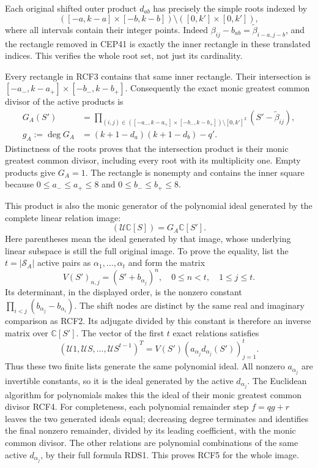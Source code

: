 \documentclass[11pt,a4paper]{article}
\begin{document}
Each original shifted outer product $d_{ab}$ has precisely the
simple roots indexed by
\[
 ([-a,k-a]\times[-b,k-b])\setminus([0,k']\times[0,k']),
 \tag{RCF3}
\]
where all intervals contain their integer points. Indeed
$\beta_{ij}-b_{ab}=\widetilde\beta_{i-a,j-b}$, and the
rectangle removed in CEP41 is exactly the inner rectangle in
these translated indices. This verifies the whole root set,
not just its cardinality.

Every rectangle in RCF3 contains that same inner rectangle.
Their intersection is
$[-a_-,k-a_+]\times[-b_-,k-b_+]$. Consequently the exact
monic greatest common divisor of the active products is
\[
 \begin{split}
 G_A(S')&=
 \prod_{(i,j)\in
   ([-a_-,k-a_+]\times[-b_-,k-b_+])\setminus[0,k']^2}
          (S'-\widetilde\beta_{ij}),\\
 g_A:=\deg G_A&=(k+1-d_a)(k+1-d_b)-q'.
 \end{split}\tag{RCF4}
\]
Distinctness of the roots proves that the intersection product
is their monic greatest common divisor, including every root
with its multiplicity one. Empty products give $G_A=1$.
The rectangle is nonempty and contains the inner square because
$0\le a_-\le a_+\le8$ and $0\le b_-\le b_+\le8$.

This product is also the monic generator of the polynomial
ideal generated by the complete linear relation image:
\[
 (\mathcal U\mathbb C[S])=G_A\mathbb C[S'].
 \tag{RCF5}
\]
Here parentheses mean the ideal generated by that image, whose
underlying linear subspace is still the full original image.
To prove the equality, list the $t=|\mathcal S_A|$ active pairs
as $\alpha_1,\ldots,\alpha_t$ and form the matrix
\[
 V(S')_{n,j}=(S'+b_{\alpha_j})^n,
       \quad 0\le n<t,\quad 1\le j\le t.
 \tag{RCF6}
\]
Its determinant, in the displayed order, is the nonzero
constant $\prod_{i<j}(b_{\alpha_j}-b_{\alpha_i})$.
The shift nodes are distinct by the same real and imaginary
comparison as RCF2. Its adjugate divided by this constant is
therefore an inverse matrix over $\mathbb C[S']$.
The vector of the first $t$ exact relations satisfies
\[
 (\mathcal U1,\mathcal US,\ldots,\mathcal US^{t-1})^T
       =V(S')(a_{\alpha_j}d_{\alpha_j}(S'))_{j=1}^t.
 \tag{RCF7}
\]
Thus these two finite lists generate the same polynomial
ideal. All nonzero $a_{\alpha_j}$ are invertible constants,
so it is the ideal generated by the active $d_{\alpha_j}$.
The Euclidean algorithm for polynomials makes this the ideal
of their monic greatest common divisor RCF4. For completeness,
each polynomial remainder step $f=qg+r$ leaves the two
generated ideals equal; decreasing degree terminates and
identifies the final nonzero remainder, divided by its leading
coefficient, with the monic common divisor. The other relations
are polynomial combinations of the same active $d_{\alpha_j}$,
by their full formula RDS1. This proves RCF5 for the whole image.
\end{document}
